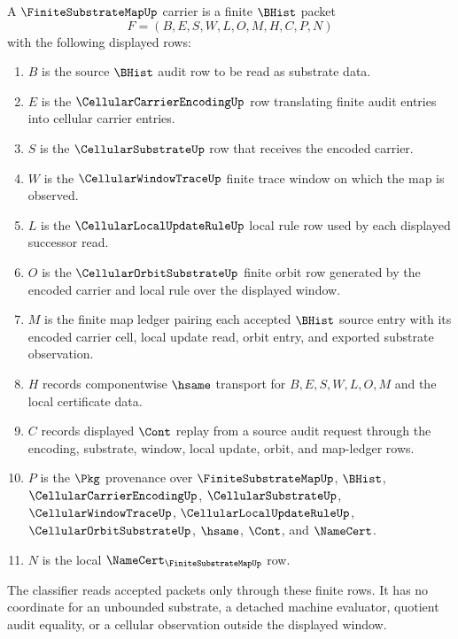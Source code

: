 \begin{definition}
\label{def:finite-substrate-map-carrier}
A $\FiniteSubstrateMapUp$ carrier is a finite $\BHist$ packet
$$
F=(B,E,S,W,L,O,M,H,C,P,N)
$$
with the following displayed rows:
\begin{enumerate}
\item $B$ is the source $\BHist$ audit row to be read as substrate data.
\item $E$ is the $\CellularCarrierEncodingUp$ row translating finite audit
entries into cellular carrier entries.
\item $S$ is the $\CellularSubstrateUp$ row that receives the encoded carrier.
\item $W$ is the $\CellularWindowTraceUp$ finite trace window on which the map
is observed.
\item $L$ is the $\CellularLocalUpdateRuleUp$ local rule row used by each
displayed successor read.
\item $O$ is the $\CellularOrbitSubstrateUp$ finite orbit row generated by the
encoded carrier and local rule over the displayed window.
\item $M$ is the finite map ledger pairing each accepted $\BHist$ source entry
with its encoded carrier cell, local update read, orbit entry, and exported
substrate observation.
\item $H$ records componentwise $\hsame$ transport for $B,E,S,W,L,O,M$ and the
local certificate data.
\item $C$ records displayed $\Cont$ replay from a source audit request through
the encoding, substrate, window, local update, orbit, and map-ledger rows.
\item $P$ is the $\Pkg$ provenance over $\FiniteSubstrateMapUp$, $\BHist$,
$\CellularCarrierEncodingUp$, $\CellularSubstrateUp$,
$\CellularWindowTraceUp$, $\CellularLocalUpdateRuleUp$,
$\CellularOrbitSubstrateUp$, $\hsame$, $\Cont$, and $\NameCert$.
\item $N$ is the local $\NameCert_{\FiniteSubstrateMapUp}$ row.
\end{enumerate}
The classifier reads accepted packets only through these finite rows. It has no
coordinate for an unbounded substrate, a detached machine evaluator, quotient
audit equality, or a cellular observation outside the displayed window.
\end{definition}

